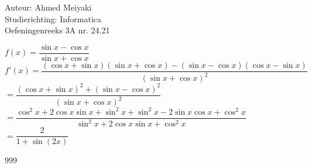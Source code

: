 \documentclass[a4paper]{article}
\begin{document}
  
\noindent \large Auteur: Ahmed Meiyaki \\
\noindent \large Studierichting: Informatica\\
\noindent \large Oefeningenreeks 3A nr. 24.21\\

\medskip

\normalsize

$f(x) = \dfrac{\sin x - \cos x}{\sin x + \cos x} $\\

$f'(x) = \dfrac{\left(\cos x + \sin x\right)\left(\sin x + \cos x\right) - \left(\sin x - \cos x\right)\left(\cos x - \sin x\right)}{\left(\sin x + \cos x\right)^2} $\\

$= \dfrac{\left(\cos x + \sin x\right)^2 + \left(\sin x - \cos x\right)^2}{\left(\sin x + \cos x\right)^2} $\\

$= \dfrac{\cos^2x + 2\cos x \sin x + \sin^2x + \sin^2x - 2\sin x \cos x + \cos^2x}{\sin^2x + 2\cos x \sin x + \cos^2x} $\\

$= \dfrac{2}{1 + \sin\left(2x\right)} $\\












\begin{thebibliography}{999}
\end{thebibliography}
\end{document}
